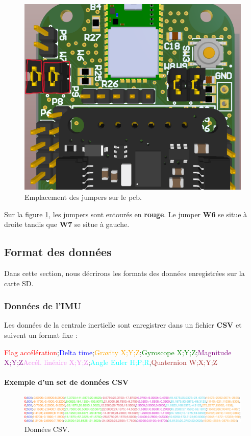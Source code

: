 \begin{figure}[h]
	\centering
	\includegraphics[width=0.4\linewidth]{../figures/code/config-mode-IMU}
	\caption{Emplacement des jumpers sur le \gls{pcb}.}
	\label{fig:config-mode-imu}
\end{figure}

Sur la figure \ref{fig:config-mode-imu}, les jumpers sont entourés en \textbf{rouge}. Le jumper \textbf{W6} se situe à droite tandis que \textbf{W7} se situe à gauche.

\clearpage	

\subsection{Format des données}

Dans cette section, nous décrirons les formats des données enregistrées sur la carte SD.

\subsubsection{Données de l'IMU}  \label{sssec:IMU-data}
Les données de la centrale inertielle sont enregistrer dans un fichier \textbf{CSV} et suivent un format fixe :

\textcolor{red}{Flag accélération};\textcolor{blue}{Delta time};\textcolor{orange}{Gravity X;Y;Z};\textcolor{green}{Gyroscope X;Y;Z};\textcolor{purple}{Magnitude X;Y;Z}\textcolor{violet}{Accél. linéaire X;Y;Z};\textcolor{cyan}{Angle Euler H;P;R},\textcolor{brown}{Quaternion W;X;Y;Z}

\paragraph*{Exemple d'un set de données CSV}

\begin{figure}[h]
	\centering
	\includegraphics[width=1\linewidth]{../figures/code/donbnees-csv}
	\caption{Données CSV.}
	\label{fig:donbnees-csv}
\end{figure}

